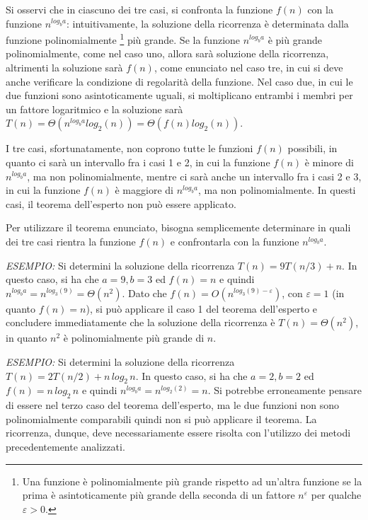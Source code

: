 Si osservi che in ciascuno dei tre casi, si confronta la funzione \(f(n)\) con la funzione \(n^{log_b a}\): intuitivamente, la soluzione della ricorrenza è determinata dalla funzione polinomialmente \footnote{Una funzione è polinomialmente più grande rispetto ad un'altra funzione se la prima è asintoticamente più grande della seconda di un fattore \(n^\varepsilon\) per qualche \(\varepsilon >0\).} più grande. Se la funzione \(n^{log_b a}\) è più grande polinomialmente, come nel caso uno, allora sarà soluzione della ricorrenza, altrimenti la soluzione sarà \(f(n)\), come enunciato nel caso tre, in cui si deve anche verificare la condizione di regolarità della funzione. Nel caso due, in cui le due funzioni sono asintoticamente uguali, si moltiplicano entrambi i membri per un fattore logaritmico e la soluzione sarà \(T(n)=\Theta(n^{log_b a}log_2(n)) = \Theta(f(n)log_2(n))\).

I tre casi, sfortunatamente, non coprono tutte le funzioni \(f(n)\) possibili, in quanto ci sarà un intervallo fra i casi 1 e 2, in cui la funzione \(f(n)\) è minore di \(n^{log_b a}\), ma non polinomialmente, mentre ci sarà anche un intervallo fra i casi 2 e 3, in cui la funzione \(f(n)\) è maggiore di \(n^{log_b a}\), ma non polinomialmente. In questi casi, il teorema dell'esperto non può essere applicato. 

Per utilizzare il teorema enunciato, bisogna semplicemente determinare in quali dei tre casi rientra la funzione \(f(n)\) e confrontarla con la funzione \(n^{log_b a}\).

\textit{ESEMPIO:} Si determini la soluzione della ricorrenza \(T(n)=9T(n/3)+n\). In questo caso, si ha che \(a=9, b=3\) ed \(f(n)=n\) e quindi \(n^{log_b a} = n^{log_3(9)}=\Theta(n^2)\). Dato che \(f(n)=O(n^{log_3(9)-\varepsilon})\), con \(\varepsilon = 1\) (in quanto \(f(n)=n\)), si può applicare il caso 1 del teorema dell'esperto e concludere immediatamente che la soluzione della ricorrenza è \(T(n)=\Theta(n^2)\), in quanto \(n^2\) è polinomialmente più grande di \(n\). 

\vspace*{10pt}

\textit{ESEMPIO:} Si determini la soluzione della ricorrenza \(T(n)=2T(n/2)+n\,log_2\,n\). In questo caso, si ha che \(a=2,b=2\) ed \(f(n)=n\,log_2\,n\) e quindi \(n^{log_b a}=n^{log_2(2)} = n\). Si potrebbe erroneamente pensare di essere nel terzo caso del teorema dell'esperto, ma le due funzioni non sono polinomialmente comparabili quindi non si può applicare il teorema. La ricorrenza, dunque, deve necessariamente essere risolta con l'utilizzo dei metodi precedentemente analizzati.

